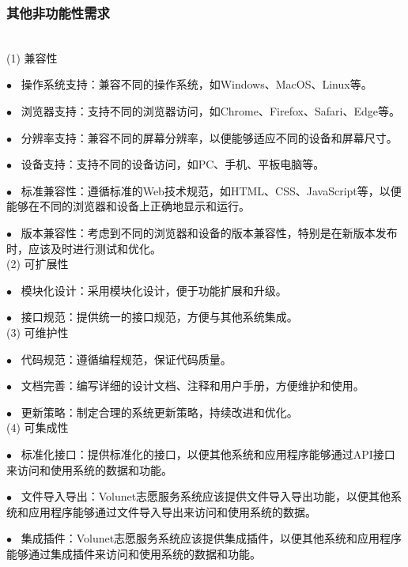 \subsubsection{其他非功能性需求}\\

(1) 兼容性

$\bullet   \enspace$ 操作系统支持：兼容不同的操作系统，如Windows、MacOS、Linux等。
\hfill 

$\bullet   \enspace$ 浏览器支持：支持不同的浏览器访问，如Chrome、Firefox、Safari、Edge等。
\hfill 

$\bullet   \enspace$ 分辨率支持：兼容不同的屏幕分辨率，以便能够适应不同的设备和屏幕尺寸。
\hfill 

$\bullet   \enspace$ 设备支持：支持不同的设备访问，如PC、手机、平板电脑等。
\hfill 

$\bullet   \enspace$ 标准兼容性：遵循标准的Web技术规范，如HTML、CSS、JavaScript等，以便能够在不同的浏览器和设备上正确地显示和运行。
\hfill 

$\bullet   \enspace$ 版本兼容性：考虑到不同的浏览器和设备的版本兼容性，特别是在新版本发布时，应该及时进行测试和优化。
\hfill \\

(2) 可扩展性

$\bullet   \enspace$ 模块化设计：采用模块化设计，便于功能扩展和升级。
\hfill 

$\bullet   \enspace$ 接口规范：提供统一的接口规范，方便与其他系统集成。
\hfill \\

(3) 可维护性

$\bullet   \enspace$ 代码规范：遵循编程规范，保证代码质量。
\hfill 

$\bullet   \enspace$ 文档完善：编写详细的设计文档、注释和用户手册，方便维护和使用。
\hfill 

$\bullet   \enspace$ 更新策略：制定合理的系统更新策略，持续改进和优化。
\hfill \\

(4) 可集成性

$\bullet   \enspace$ 标准化接口：提供标准化的接口，以便其他系统和应用程序能够通过API接口来访问和使用系统的数据和功能。
\hfill 

$\bullet   \enspace$ 文件导入导出：Volunet志愿服务系统应该提供文件导入导出功能，以便其他系统和应用程序能够通过文件导入导出来访问和使用系统的数据。
\hfill 

$\bullet   \enspace$ 集成插件：Volunet志愿服务系统应该提供集成插件，以便其他系统和应用程序能够通过集成插件来访问和使用系统的数据和功能。
\hfill 

